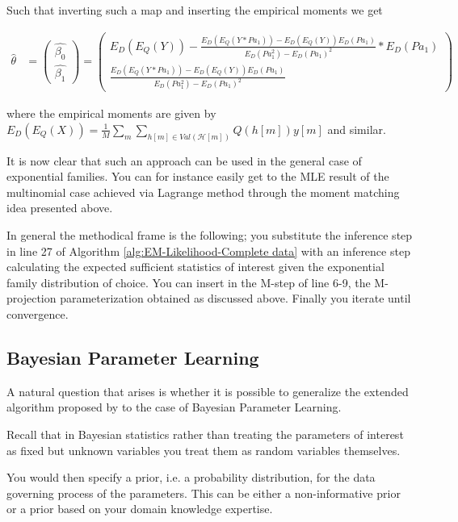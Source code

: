 \documentclass[11pt]{article}
\begin{document}
\begin{article}
Such that inverting such a map and inserting the empirical moments
we get

 \begin{align}
 \hat{\theta} &= \begin{pmatrix}
                 \hat{\beta_0}\\
		 \hat{\beta_1}
           \end{pmatrix} 
        = \begin{pmatrix}
		 E_D(E_Q(Y)) - \frac{E_D(E_Q(Y*Pa_1))- E_D(E_Q(Y))E_D(Pa_1)}{E_D(Pa_1^2) - E_D(Pa_1)^2} * E_D(Pa_1)\\
		 \frac{E_D(E_Q(Y*Pa_1))- E_D(E_Q(Y))E_D(Pa_1)}{E_D(Pa_1^2) - E_D(Pa_1)^2}
           \end{pmatrix}
\end{align}

where the empirical moments are given by \(E_D(E_Q(X)) = \frac{1}{M}
   \sum_m \sum_{h[m] \in Val(\mathscr{H}[m])} Q(h[m]) y[m]\) and
similar.    

It is now clear that such an approach can be used in the general
case of exponential families. You can for instance easily get to
the MLE result of the multinomial case achieved via Lagrange method
through the moment matching idea presented above.

In general the methodical frame is the following; you substitute
the inference step in line 27 of Algorithm
\ref{alg:EM-Likelihood-Complete data} with an inference step
calculating the expected sufficient statistics of interest given
the exponential family distribution of choice. You can insert in
the M-step of line 6-9, the M-projection parameterization obtained
as discussed above. Finally you iterate until convergence.

\subsection{Bayesian Parameter Learning}
\label{bayes-parameter-learning}
A natural question that arises is whether it is possible to
generalize the extended algorithm proposed by \cite{Mrad_2015} to the
case of Bayesian Parameter Learning.

Recall that in Bayesian statistics rather than treating the
parameters of interest as fixed but unknown variables you treat
them as random variables themselves.

You would then specify a prior, i.e. a probability distribution, for
the data governing process of the parameters. This can be either a
non-informative prior or a prior based on your domain knowledge
expertise.


\end{article}
\end{document}

